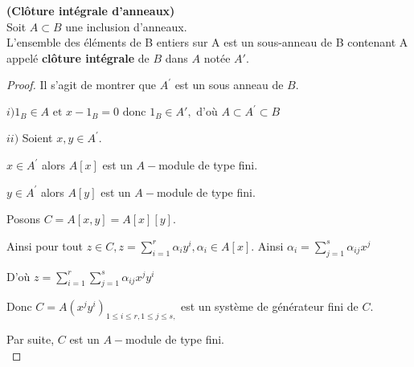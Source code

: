 \begin{moncorollaire}\textbf{(Clôture intégrale d'anneaux)}\cite{Di2}\\
	Soit $A \subset B$ une inclusion d'anneaux.\\
	L'ensemble des éléments de B entiers sur A est un sous-anneau de B contenant A appelé \textbf{clôture intégrale} de $B$ dans $A$ notée $A'$.
\end{moncorollaire}
\begin{proof}
	Il s'agit de montrer que $A^{\prime }$ est un sous anneau de $B.$
	
	$i)$$1_B \in A \text{ et } x-1_B = 0 \text{ donc } 1_B\in A',\text{ d'où } A\subset A^{\prime }\subset B$
	
	$ii)$ Soient $x,y\in A^{\prime }.$
	
	$x\in A^{\prime }$ alors $A[x]$ est un $A-$module de type fini.
	
	$y\in A^{\prime }$ alors $A[y]$ est un $A-$module de type fini.
	
	Posons $C=A[x,y]=A[x][y].$
	
	Ainsi pour tout $z\in C,z=\sum\limits_{i=1}^{r}\alpha _{i}y^{i},\alpha
	_{i}\in A[x].$ Ainsi $\alpha _{i}=\sum\limits_{j=1}^{s}\alpha _{ij}x^{j}$
	
	D'où $z=\sum\limits_{i=1}^{r}\sum\limits_{j=1}^{s}\alpha _{ij}x^{j}y^{i}$
	
	Donc $C=A(x^{j}y^{i})_{1\leq i\leq r,1\leq j\leq s,}$ est un système de générateur fini de $C.$
	
	Par suite, $C$ est un $A-$module de type fini.\\
\end{proof}

